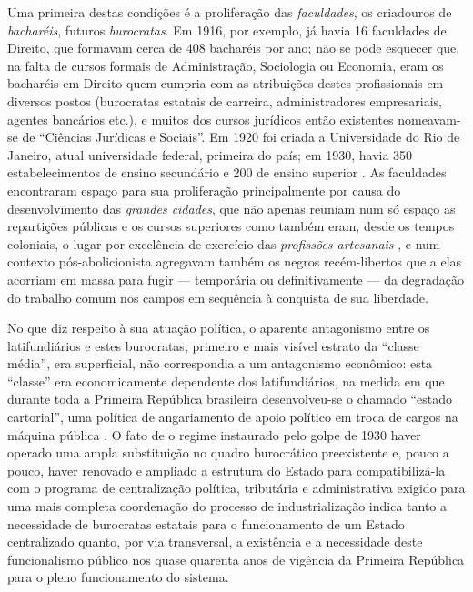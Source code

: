 Uma primeira destas condições é a proliferação das \textit{faculdades}, os criadouros de \textit{bacharéis}, futuros \textit{burocratas}. Em 1916, por exemplo, já havia 16 faculdades de Direito, que formavam cerca de 408 bacharéis por ano; não se pode esquecer que, na falta de cursos formais de Administração, Sociologia ou Economia, eram os bacharéis em Direito quem cumpria com as atribuições destes profissionais em diversos postos (burocratas estatais de carreira, administradores empresariais, agentes bancários etc.), e muitos dos cursos jurídicos então existentes nomeavam-se de ``Ciências Jurídicas e Sociais''. Em 1920 foi criada a Universidade do Rio de Janeiro, atual universidade federal, primeira do país; em 1930, havia 350 estabelecimentos de ensino secundário e 200 de ensino superior \cite[p.~17]{pinheiro_clamed_1977}. As faculdades encontraram espaço para sua proliferação principalmente por causa do desenvolvimento das \textit{grandes cidades}, que não apenas reuniam num só espaço as repartições públicas e os cursos superiores como também eram, desde os tempos coloniais, o lugar por excelência de exercício das \textit{profissões artesanais} \cite{REIS2012}, e num contexto pós-abolicionista agregavam também os negros recém-libertos que a elas acorriam em massa para fugir --- temporária ou definitivamente --- da degradação do trabalho comum nos campos em sequência à conquista de sua liberdade\cite{AZEVEDO2004, bacelar_negrosalvador_1994}. 

No que diz respeito à sua atuação política, o aparente antagonismo entre os latifundiários e estes burocratas, primeiro e mais visível estrato da ``classe média'', era superficial, não correspondia a um antagonismo econômico: esta ``classe'' era economicamente dependente dos latifundiários, na medida em que durante toda a Primeira República brasileira desenvolveu-se o chamado ``estado cartorial'', uma política de angariamento de apoio político em troca de cargos na máquina pública \cite[p.~20]{pinheiro_clamed_1977}. O fato de o regime instaurado pelo golpe de 1930 haver operado uma ampla substituição no quadro burocrático preexistente e, pouco a pouco, haver renovado e ampliado a estrutura do Estado para compatibilizá-la com o programa de centralização política, tributária e administrativa exigido para uma mais completa coordenação do processo de industrialização \cite{araujo_dasp_2017} indica tanto a necessidade de burocratas estatais para o funcionamento de um Estado centralizado quanto, por via transversal, a existência e a necessidade deste funcionalismo público nos quase quarenta anos de vigência da Primeira República para o pleno funcionamento do sistema.

